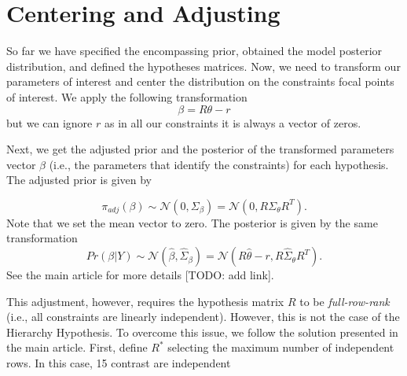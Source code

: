 \documentclass[
]{book}
\begin{document}
\hypertarget{centering-and-adjusting}{%
\section{Centering and Adjusting}\label{centering-and-adjusting}}

So far we have specified the encompassing prior, obtained the model posterior distribution, and defined the hypotheses matrices. Now, we need to transform our parameters of interest and center the distribution on the constraints focal points of interest. We apply the following transformation
\[
\beta = R\theta - r
\]
but we can ignore \(r\) as in all our constraints it is always a vector of zeros.

Next, we get the adjusted prior and the posterior of the transformed parameters vector \(\beta\) (i.e., the parameters that identify the constraints) for each hypothesis. The adjusted prior is given by

\[
\pi_{adj}(\beta) \sim \mathcal{N}(0, \Sigma_{\beta}) = \mathcal{N}(0, R\Sigma_{\theta}R^T).
\]
Note that we set the mean vector to zero. The posterior is given by the same transformation
\[
Pr(\beta|Y) \sim \mathcal{N}(\hat{\beta}, \hat{\Sigma}_{\beta}) = \mathcal{N}(R\hat{\theta}-r, R\hat{\Sigma}_{\theta}R^T).
\]
See the main article for more details {[}TODO: add link{]}.

This adjustment, however, requires the hypothesis matrix \(R\) to be \emph{full-row-rank} (i.e., all constraints are linearly independent). However, this is not the case of the Hierarchy Hypothesis. To overcome this issue, we follow the solution presented in the main article. First, define \(R^*\) selecting the maximum number of independent rows. In this case, 15 contrast are independent
\end{document}
